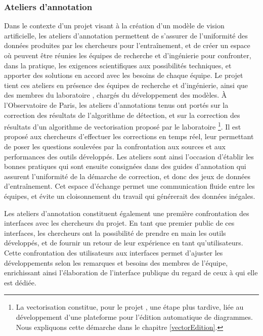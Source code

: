     \subsubsection{Ateliers d'annotation}
    Dans le contexte d'un projet visant à la création d'un modèle de vision artificielle, les ateliers d'annotation permettent de s'assurer de l'uniformité des données produites par les chercheurs pour l'entraînement, et de créer un espace où peuvent être réunies les équipes de recherche et d'ingénierie pour confronter, dans la pratique, les exigences scientifiques aux possibilités techniques, et apporter des solutions en accord avec les besoins de chaque équipe. Le projet \eida tient ces ateliers en présence des équipes de recherche et d'ingénierie, ainsi que des membres du laboratoire \imagine, chargés du développement des modèles. À l'Observatoire de Paris, les ateliers d'annotations tenus ont portés sur la correction des résultats de l'algorithme de détection, et sur la correction des résultats d'un algorithme de vectorisation proposé par le laboratoire \imagine\footnote{La vectorisation constitue, pour le projet \eida, une étape plus tardive, liée au développement d'une plateforme pour l'édition automatique de diagrammes. Nous expliquons cette démarche dans le chapitre \ref{vectorEdition}.}. Il est proposé aux chercheurs d'effectuer les corrections en temps réel, leur permettant de poser les questions soulevées par la confrontation aux sources et aux performances des outils développés. Les ateliers sont ainsi l'occasion d'établir les bonnes pratiques qui sont ensuite consignées dans des guides d'annotation qui assurent l'uniformité de la démarche de correction, et donc des jeux de données d'entraînement. Cet espace d'échange permet une communication fluide entre les équipes, et évite un cloisonnement du travail qui générerait des données inégales.
    
    Les ateliers d'annotation constituent également une première confrontation des interfaces avec les chercheurs du projet. En tant que premier public de ces interfaces, les chercheurs ont la possibilité de prendre en main les outils développés, et de fournir un retour de leur expérience en tant qu'utilisateurs. Cette confrontation des utilisateurs aux interfaces permet d'ajuster les développements selon les remarques et besoins des membres de l'équipe, enrichissant ainsi l'élaboration de l'interface publique du regard de ceux à qui elle est dédiée.

    
